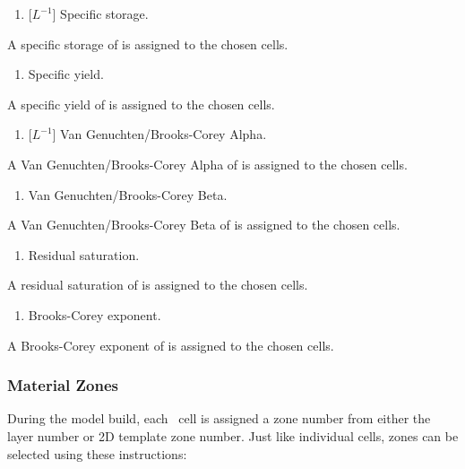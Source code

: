{
    {
        \squish
        \begin{enumerate}
        \item {} [$L^{-1}$]  Specific storage.
        \end{enumerate}
          A specific storage of  is assigned to the chosen cells.
    }

    {
        \squish
        \begin{enumerate}
        \item {}  Specific yield.
        \end{enumerate}
          A specific yield of   is assigned to the chosen cells.
    }

    {
        \squish
        \begin{enumerate}
        \item {} [$L^{-1}$]  Van Genuchten/Brooks-Corey Alpha.
        \end{enumerate}
          A Van Genuchten/Brooks-Corey Alpha of  is assigned to the chosen cells.
    }

    {
        \squish
        \begin{enumerate}
        \item {}  Van Genuchten/Brooks-Corey Beta.
        \end{enumerate}
          A Van Genuchten/Brooks-Corey Beta of  is assigned to the chosen cells.
    }

    {
        \squish
        \begin{enumerate}
        \item {}  Residual saturation.
        \end{enumerate}
          A residual saturation of  is assigned to the chosen cells.
    }

    {
        \squish
        \begin{enumerate}
        \item {}  Brooks-Corey exponent.
        \end{enumerate}
          A Brooks-Corey exponent of  is assigned to the chosen cells.
    }


\subsubsection{Material Zones}  
During the model build, each \gwf\ cell is assigned a zone number from either the layer number or 2D template zone number. Just like individual cells, zones can be selected using these instructions\label{page:zoneSelect}:

}
